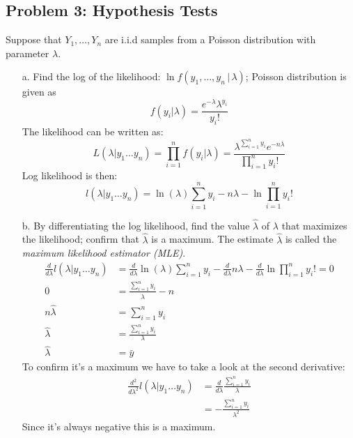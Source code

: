 \documentclass{article}
\newcommand{\1}{\mathbf{1}}
\begin{document}
\newpage
\subsection*{Problem 3: Hypothesis Tests}

Suppose that $Y_1,\ldots ,Y_n$ are i.i.d samples from a Poisson distribution with parameter $\lambda$. 
\begin{itemize}
    \item[a.] Find the log of the likelihood: $\ln f(y_1,\ldots ,y_n\,|\, \lambda)$;
    Poisson distribution is given as 
    $$ f(y_i|\lambda) = \frac{e^{-\lambda} \lambda^{y_i}}{y_i!} $$
    The likelihood can be written as:
    $$L(\lambda|y_1\hdots y_n) = \prod_{i=1}^n f(y_i|\lambda)  = \frac{\lambda^{\sum_{i=1}^n y_i} e^{-n\lambda}}{\prod_{i=1}^n y_i!}$$
    Log likelihood is then:
    $$ l(\lambda|y_1\hdots y_n) = \ln(\lambda)\sum_{i=1}^n y_i - n\lambda - \ln \prod_{i=1}^n y_i! $$ 
    
    \item[b.] By differentiating the log likelihood, find the value $\hat{\lambda}$ of $\lambda$ that maximizes the likelihood; confirm that $\hat{\lambda}$ is a maximum. The estimate  $\hat{\lambda}$  is called the {\it maximum likelihood estimator (MLE)}.
    \begin{align*}
        \frac{d}{d\lambda} l(\lambda|y_1\hdots y_n) &= \frac{d}{d\lambda}\ln(\lambda)\sum_{i=1}^n y_i - \frac{d}{d\lambda}n\lambda - \frac{d}{d\lambda}\ln \prod_{i=1}^n y_i! = 0 \\
         0 &= \frac{\sum_{i=1}^n y_i}{\hat\lambda} - n \\
         n\hat\lambda &= \sum_{i=1}^n y_i  \\
         \hat\lambda &= \frac{\sum_{i=1}^n y_i}{\lambda} \\
         \hat\lambda &= \bar y
    \end{align*}
    To confirm it's a maximum we have to take a look at the second derivative:
    \begin{align*}
        \frac{d^2}{d\lambda^2} l(\lambda|y_1\hdots y_n) &= \frac{d}{d\lambda} \frac{\sum_{i=1}^n y_i}{\lambda} \\
        &= - \frac{\sum_{i=1}^n y_i}{\lambda^2}
    \end{align*}
    Since it's always negative this is a maximum. 
\end{itemize}
\end{document}
